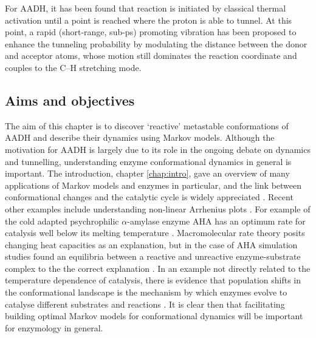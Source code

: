 For AADH, it has been found that reaction is initiated by classical thermal activation until a point is reached where the proton is able to tunnel. At this point, a rapid (short-range, sub-ps) promoting vibration has been proposed to enhance the tunneling probability by modulating the distance between the donor and acceptor atoms, whose motion still dominates the reaction coordinate and couples to the C–H stretching mode. \cite{johannissenProtonTunnelingAromatic2007, masgrauTunnelingClassicalPaths2007,  johannissenEnzymeAromaticAmine2008} 


\subsection{Aims and objectives}

The aim of this chapter is to discover `reactive' metastable conformations of AADH and describe their dynamics using Markov models. Although the motivation for AADH is largely due to its role in the ongoing debate on dynamics and tunnelling, understanding enzyme conformational dynamics in general is important. The introduction, chapter \ref{chap:intro}, gave an overview of many applications of Markov models and enzymes in particular, and the link between conformational changes and the catalytic cycle is widely appreciated \cite{karplusMolecularDynamicsProtein2005, hammesMultipleConformationalChanges2002, roca2008relationship}. Recent other examples include understanding non-linear Arrhenius plots \cite{truhlarConvexArrheniusPlots2001,danielNewUnderstandingHow2010}. For example of the cold adapted psychrophilic $\alpha$-amylase enzyme AHA has an optimum rate for catalysis well below its melting temperature \cite{aqvistHiddenConformationalStates2020}. Macromolecular rate theory \cite{arcusTemperatureDynamicsEnzymeCatalyzed2020} posits changing heat capacities as an explanation, but in the case of AHA simulation studies found an equilibria between a reactive and unreactive enzyme-substrate complex to the the correct explanation \cite{aqvistHiddenConformationalStates2020}.  In an example not directly related to the temperature dependence of catalysis, there is evidence that population shifts in the conformational landscape is the mechanism by which  enzymes evolve to catalyse different substrates and reactions \cite{maria-solanoRoleConformationalDynamics2018, campbellRoleProteinDynamics2016,romero-riveraRoleConformationalDynamics2017}. It is clear then that facilitating building optimal Markov models for conformational dynamics will be important for enzymology in general.  

